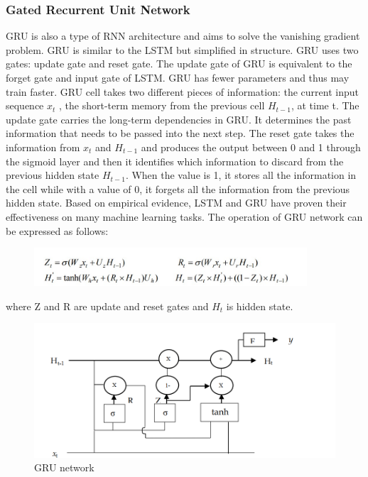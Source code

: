 \subsubsection{Gated Recurrent Unit Network}
GRU is also a type of RNN architecture and aims to solve the vanishing gradient problem. GRU is similar to the LSTM but simplified in structure. GRU uses two gates: update gate and reset gate. The update gate of GRU is equivalent to the forget gate and input gate of LSTM. GRU has fewer parameters and thus may train faster. GRU cell takes two different pieces of information: the current input sequence $x_t$ , the short-term memory from the previous cell $H_{t-1}$, at time t. The update gate carries the long-term dependencies in GRU. It determines the past information that needs to be passed into the next step. The reset gate takes the information from $x_t$ and $H_{t-1}$ and produces the output between 0 and 1 through the sigmoid layer and then it identifies which information to discard from the previous hidden state $H_{t-1}$. When the value is 1, it stores all the information in the cell while with a value of 0, it forgets all the information from the previous hidden state. Based on empirical evidence, LSTM and GRU have proven their effectiveness on many machine learning tasks. The operation of GRU network can be expressed as follows: \par 
\begin{figure}[tbh] %
\begin{center}
	\includegraphics[width=4in]{images/gform.jpg} 
\end{center}
\end{figure}
where Z and R are update and reset gates and $H_t$ is hidden state.
\begin{figure}[tbh] %
\begin{center}
	\includegraphics[width=5in]{images/gfig.png} 
	\caption{GRU network} %
	\label{GRU network} %
\end{center}
\end{figure}

